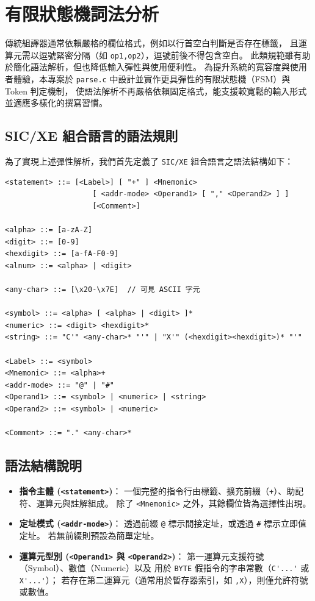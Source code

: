 
\section{有限狀態機詞法分析}
傳統組譯器通常依賴嚴格的欄位格式，例如以行首空白判斷是否存在標籤，
且運算元需以逗號緊密分隔（如 \lstinline{op1,op2}），逗號前後不得包含空白。
此類規範雖有助於簡化語法解析，但也降低輸入彈性與使用便利性。
為提升系統的寬容度與使用者體驗，本專案於 \lstinline{parse.c} 中設計並實作更具彈性的有限狀態機（FSM）與 Token 判定機制，
使語法解析不再嚴格依賴固定格式，能支援較寬鬆的輸入形式並適應多樣化的撰寫習慣。

\subsection{SIC/XE 組合語言的語法規則}

為了實現上述彈性解析，我們首先定義了 \lstinline{SIC/XE} 組合語言之語法結構如下：

\begin{lstlisting}
<statement> ::= [<Label>] [ "+" ] <Mnemonic>
                    [ <addr-mode> <Operand1> [ "," <Operand2> ] ]
                    [<Comment>]

<alpha> ::= [a-zA-Z]
<digit> ::= [0-9]
<hexdigit> ::= [a-fA-F0-9]
<alnum> ::= <alpha> | <digit>

<any-char> ::= [\x20-\x7E]  // 可見 ASCII 字元

<symbol> ::= <alpha> [ <alpha> | <digit> ]*
<numeric> ::= <digit> <hexdigit>*
<string> ::= "C'" <any-char>* "'" | "X'" (<hexdigit><hexdigit>)* "'"

<Label> ::= <symbol>
<Mnemonic> ::= <alpha>+
<addr-mode> ::= "@" | "#"
<Operand1> ::= <symbol> | <numeric> | <string>
<Operand2> ::= <symbol> | <numeric>

<Comment> ::= "." <any-char>*
\end{lstlisting}

\subsection{語法結構說明}
\begin{itemize}
    \item \textbf{指令主體 (\lstinline{<statement>})}：
          一個完整的指令行由標籤、擴充前綴（\lstinline{+}）、助記符、運算元與註解組成。
          除了 \lstinline{<Mnemonic>} 之外，其餘欄位皆為選擇性出現。
    \item \textbf{定址模式 (\lstinline{<addr-mode>})}：
          透過前綴 \lstinline{@} 標示間接定址，或透過 \lstinline{#} 標示立即值定址。
          若無前綴則預設為簡單定址。
    \item \textbf{運算元型別 (\lstinline{<Operand1>} 與 \lstinline{<Operand2>})}：
          第一運算元支援符號（Symbol）、數值（Numeric）以及
          用於 \lstinline{BYTE} 假指令的字串常數（\lstinline{C'...'} 或 \lstinline{X'...'}）；
          若存在第二運算元（通常用於暫存器索引，如 \lstinline{,X}），則僅允許符號或數值。
\end{itemize}

